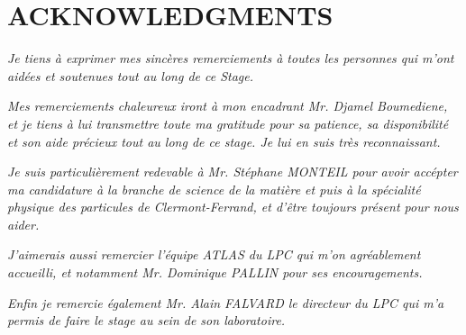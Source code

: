 \section*{ACKNOWLEDGMENTS}

\textit{Je tiens \`a exprimer mes sinc\`eres remerciements \`a toutes les personnes qui m'ont aid\'ees et soutenues tout au long de ce Stage.}

\textit{Mes remerciements chaleureux iront \`a mon encadrant Mr. Djamel Boumediene, et je tiens \`a lui transmettre toute ma gratitude pour sa patience, sa disponibilit\'e et son aide pr\'ecieux tout au long de ce stage. Je lui en suis tr\`es reconnaissant.}

\textit{Je suis particuli\`erement redevable \`a Mr. St\'ephane MONTEIL pour avoir acc\'epter ma candidature \`a la branche de science de la mati\`ere et puis \`a la sp\'ecialit\'e physique des particules de Clermont-Ferrand, et d'\^etre toujours pr\'esent pour nous aider.}
 
\textit{J'aimerais aussi remercier l'\'equipe ATLAS du LPC qui m'on agr\'eablement accueilli, et notamment Mr. Dominique PALLIN pour ses encouragements.}

\textit{Enfin je remercie \'egalement Mr. Alain FALVARD le directeur du LPC qui m'a permis de faire le stage au sein de son laboratoire.}